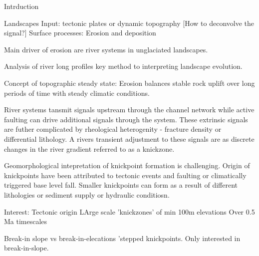 Intrduction

Landscapes
Input: tectonic plates or dynamic topography
[How to deconvolve the signal?]
Surface processes: Erosion and deposition

Main driver of erosion are river systems in unglaciated landscapes. 

Analysis of river long profiles key method to interpreting landscape evolution.

Concept of topographic steady state: Erosion balances stable rock uplift over long periods of time with steady climatic conditions. 

River systems tansmit signals upstream through the channel network while active faulting can drive additional signals through the system. These extrinsic signals are futher complicated by rheological heterogenity - fracture density or differential lithology. A rivers transient adjustment to these signals are as discrete changes in the river gradient referred to as a knickzone. 

Geomorphological intepretation of knickpoint formation is challenging. Origin of knickpoints have been attributed to tectonic events and faulting or climatically triggered base level fall. Smaller knickpoints can form as a result of different lithologies or sediment supply or hydraulic conditiosn. 

Interest:
Tectonic origin
LArge scale 'knickzones' of min 100m elevations
Over 0.5 Ma timescales

Break-in slope vs break-in-elecations 'stepped knickpoints. Only interested in break-in-slope. 